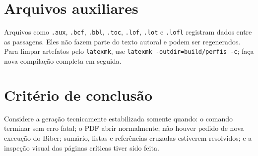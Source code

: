 \section{Arquivos auxiliares}

Arquivos como \texttt{.aux}, \texttt{.bcf}, \texttt{.bbl}, \texttt{.toc}, \texttt{.lof}, \texttt{.lot} e \texttt{.lofl} registram dados entre as passagens. Eles não fazem parte do texto autoral e podem ser regenerados. Para limpar artefatos pelo \texttt{latexmk}, use \texttt{latexmk -outdir=build/perfis -c}; faça nova compilação completa em seguida.

\section{Critério de conclusão}

Considere a geração tecnicamente estabilizada somente quando: o comando terminar sem erro fatal; o PDF abrir normalmente; não houver pedido de nova execução do Biber; sumário, listas e referências cruzadas estiverem resolvidos; e a inspeção visual das páginas críticas tiver sido feita.
